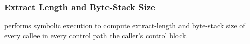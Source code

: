 \documentclass[letterpaper,twocolumn,10pt]{article}
\begin{document}
% 
% 
% 

\subsubsection{Extract Length and Byte-Stack Size}
\label{subsection:extract-length-and-byte-stack-size}

\ucomp performs symbolic execution to compute extract-length and 
byte-stack size of every callee \uprogram in every control path the 
caller's control block.
\end{document}
